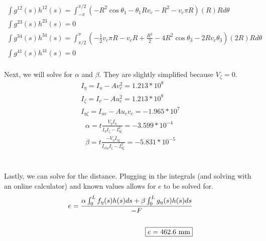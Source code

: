 \documentclass[12 pt]{article}
\begin{document}
\begin{align*}
    \int{g^{12}(s)h^{12}(s)}=\int_{-\pi}^{\pi/2}(-R^2\cos{\theta_1}-\theta_1Rv_c-R^2-v_c\pi R)(R)Rd\theta \\
    \int{g^{23}(s)h^{23}(s)}=0 \\
    \int{g^{34}(s)h^{34}(s)}=\int_{\pi/2}^{\pi}(-\frac{1}{2}v_c\pi R-v_cR+\frac{R^2}{2}-4R^2\cos{\theta_3}-2Rv_c\theta_3)(2R)Rd\theta \\
    \int{g^{41}(s)h^{41}(s)}=0
\end{align*} \\
Next, we will solve for $\alpha$ and $\beta$. They are slightly simplified because $V_{\zeta}=0$.
\begin{align*}
    I_{\eta}=I_u-Av_c^2=1.213*10^8 \\
    I_{\zeta}=I_v-Au_c^2=1.213*10^8 \\
    I_{\eta \zeta}=I_{uv}-Au_cv_c=-1.965*10^7
\end{align*}
\begin{align*}
    \alpha=t\frac{V_{\eta}I_{\eta}}{I_{\eta}I_{\zeta}-I_{\eta\zeta}^2}=-3.599*10^{-4} \\
    \beta=t\frac{-V_{\eta}I_{\eta\zeta}}{I_{eta}I_{\zeta}-I_{\eta\zeta}^2}=-5.831*10^{-5}
\end{align*} \\ \\
Lastly, we can solve for the distance. Plugging in the integrals (and solving with an online calculator) and known
values allows for $e$ to be solved for.
\begin{align*}
    e=\frac{\alpha \int_{0}^{L}{f_{\eta}(s)h(s)ds} + \beta \int_{0}^{L}{g_{\eta}(s)h(s)ds}}{-F} \\ \\
    \fbox{$e=462.6$ mm}
\end{align*}
\pagebreak
\end{document}
